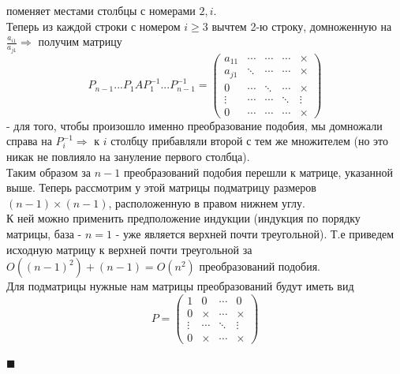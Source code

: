 \documentclass[a4paper,12pt,titlepage,final]{article}
\begin{document}
поменяет местами столбцы с номерами $2, i$. \\
Теперь из каждой строки с номером $i \geq 3$ вычтем 2-ю строку, домноженную на $\frac{a_{i1}}{a_{j1}} \Rightarrow$ 
получим матрицу 
$$P_{n-1}...P_1AP_1^{-1}...P_{n - 1}^{-1} = 
\begin{pmatrix}
    a_{11} & \cdots & \cdots & \cdots & \times \\
    a_{j1} & \ddots & \cdots & \cdots &  \times \\
    0 & \cdots & \ddots & \cdots & \times \\
    \vdots & \cdots & \cdots & \ddots & \vdots \\
    0 & \cdots & \cdots & \cdots & \times
\end{pmatrix}
$$ - для того, чтобы произошло именно преобразование подобия, мы домножали справа на $P_i^{-1} \Rightarrow$ 
к $i$ столбцу прибавляли второй с тем же множителем (но это никак не повлияло на зануление первого столбца). \\
Таким образом за $n - 1$ преобразований подобия перешли к матрице, указанной выше. Теперь рассмотрим у этой матрицы подматрицу 
размеров $(n - 1) \times (n - 1)$, расположенную в правом нижнем углу. \\
К ней можно применить предположение индукции (индукция по порядку матрицы, база - $n = 1$ - уже является верхней почти треугольной). 
Т.е приведем исходную матрицу к верхней почти треугольной за $O((n - 1)^2) + (n - 1) = O(n^2)$ преобразований подобия. \\
Для подматрицы нужные нам матрицы преобразований будут иметь вид
$$P = 
\begin{pmatrix}
    1 & 0 & \cdots & 0 \\
    0 & \times & \cdots & \times \\
    \vdots & \cdots & \ddots & \vdots \\
    0 & \times & \cdots & \times
\end{pmatrix}
$$ \\
$\blacksquare$ \\ \\ \\


\end{document}
